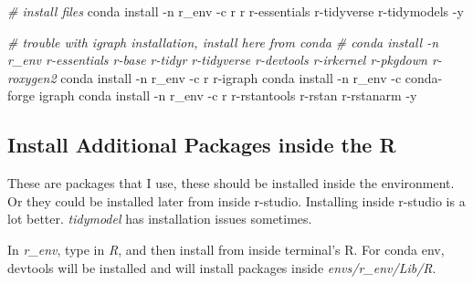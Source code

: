 \documentclass[]{article}
\newenvironment{Shaded}{\begin{snugshade}}{\end{snugshade}}
\newcommand{\CommentTok}[1]{\textcolor[rgb]{0.56,0.35,0.01}{\textit{#1}}}
\newcommand{\ExtensionTok}[1]{#1}
\newcommand{\NormalTok}[1]{#1}
\begin{document}
\begin{Shaded}
\begin{Highlighting}[]
\CommentTok{# install files}
\ExtensionTok{conda}\NormalTok{ install -n r_env -c r r r-essentials r-tidyverse r-tidymodels -y}

\CommentTok{# trouble with igraph installation, install here from conda}
\CommentTok{# conda install -n r_env r-essentials r-base r-tidyr r-tidyverse r-devtools r-irkernel r-pkgdown r-roxygen2}
\ExtensionTok{conda}\NormalTok{ install -n r_env -c r r-igraph}
\ExtensionTok{conda}\NormalTok{ install -n r_env -c conda-forge igraph}
\ExtensionTok{conda}\NormalTok{ install -n r_env -c r r-rstantools r-rstan r-rstanarm -y}
\end{Highlighting}
\end{Shaded}

\hypertarget{install-additional-packages-inside-the-r}{%
\subsection{Install Additional Packages inside the
R}\label{install-additional-packages-inside-the-r}}

These are packages that I use, these should be installed inside the
environment. Or they could be installed later from inside r-studio.
Installing inside r-studio is a lot better. \emph{tidymodel} has
installation issues sometimes.

In \emph{r\_env}, type in \emph{R}, and then install from inside
terminal's R. For conda env, devtools will be installed and will install
packages inside \emph{envs/r\_env/Lib/R}.
\end{document}
